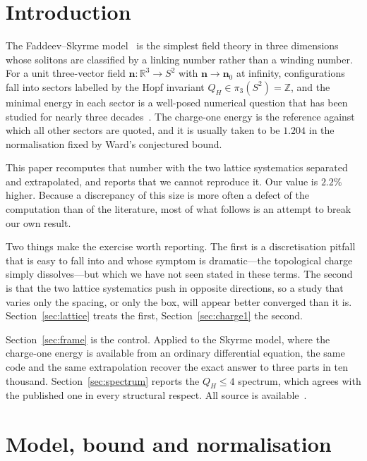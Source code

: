 \documentclass[aps,prd,preprint,nofootinbib,longbibliography]{revtex4-2}
\newcommand{\nv}{\bm{n}}
\newcommand{\Qh}{Q_H}
\begin{document}
\section{Introduction}
\label{sec:intro}

The Faddeev--Skyrme model~\cite{faddeev1999} is the simplest field theory in
three dimensions whose solitons are classified by a linking number rather than a
winding number. For a unit three-vector field $\nv:\mathbb{R}^3\to S^2$ with
$\nv\to\nv_0$ at infinity, configurations fall into sectors labelled by the Hopf
invariant $\Qh\in\pi_3(S^2)=\mathbb{Z}$, and the minimal energy in each sector is
a well-posed numerical question that has been studied for nearly three
decades~\cite{faddeev1997,gladikowski1997,battye1998,hietarinta1999,ward1999,sutcliffe2007}.
The charge-one energy is the reference against which all other sectors are
quoted, and it is usually taken to be $1.204$ in the normalisation fixed by
Ward's conjectured bound.

This paper recomputes that number with the two lattice systematics separated and
extrapolated, and reports that we cannot reproduce it. Our value is $2.2\%$
higher. Because a discrepancy of this size is more often a defect of the
computation than of the literature, most of what follows is an attempt to break
our own result.

Two things make the exercise worth reporting. The first is a discretisation
pitfall that is easy to fall into and whose symptom is dramatic---the topological
charge simply dissolves---but which we have not seen stated in these terms. The
second is that the two lattice systematics push in opposite directions, so a
study that varies only the spacing, or only the box, will appear better converged
than it is. Section~\ref{sec:lattice} treats the first,
Section~\ref{sec:charge1} the second.

Section~\ref{sec:frame} is the control. Applied to the Skyrme model, where the
charge-one energy is available from an ordinary differential equation, the same
code and the same extrapolation recover the exact answer to three parts in ten
thousand. Section~\ref{sec:spectrum} reports the $\Qh\le4$ spectrum, which
agrees with the published one in every structural respect. All source is
available~\cite{repo}.

\section{Model, bound and normalisation}
\label{sec:model}
\end{document}
